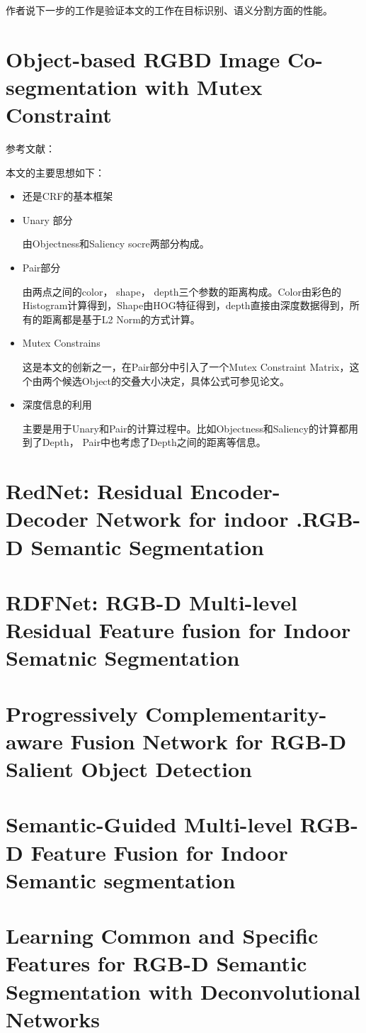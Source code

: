 作者说下一步的工作是验证本文的工作在目标识别、语义分割方面的性能。

\section{Object-based RGBD Image Co-segmentation with Mutex Constraint}

参考文献：

本文的主要思想如下：

\begin{itemize}
\item 还是CRF的基本框架
\item Unary 部分

由Objectness和Saliency socre两部分构成。

\item Pair部分

由两点之间的color， shape， depth三个参数的距离构成。Color由彩色的Histogram计算得到，Shape由HOG特征得到，depth直接由深度数据得到，所有的距离都是基于L2 Norm的方式计算。

\item Mutex Constrains

这是本文的创新之一，在Pair部分中引入了一个Mutex Constraint Matrix，这个由两个候选Object的交叠大小决定，具体公式可参见论文。

\item 深度信息的利用

主要是用于Unary和Pair的计算过程中。比如Objectness和Saliency的计算都用到了Depth， Pair中也考虑了Depth之间的距离等信息。

\end{itemize}


\section{RedNet: Residual Encoder-Decoder Network for indoor .RGB-D Semantic Segmentation}
 
\section{RDFNet: RGB-D Multi-level Residual Feature fusion for Indoor Sematnic Segmentation}


\section{Progressively Complementarity-aware Fusion Network for RGB-D Salient Object Detection}

\section{Semantic-Guided Multi-level RGB-D Feature Fusion for Indoor Semantic segmentation}

\section{Learning Common and Specific Features for RGB-D Semantic Segmentation with Deconvolutional Networks}














